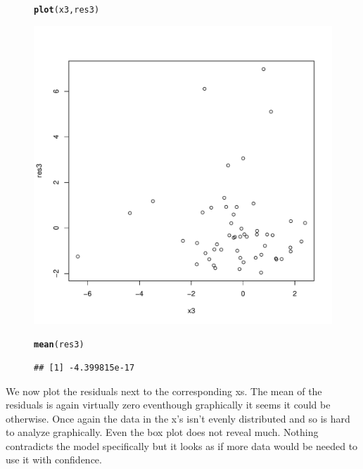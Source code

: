 \documentclass{article}\usepackage[]{graphicx}\usepackage[]{color}
\makeatletter
\def\maxwidth{ %
  \ifdim\Gin@nat@width>\linewidth
    \linewidth
  \else
    \Gin@nat@width
  \fi
}
\newcommand{\hlstd}[1]{\textcolor[rgb]{0.345,0.345,0.345}{#1}}%
\newcommand{\hlkwd}[1]{\textcolor[rgb]{0.737,0.353,0.396}{\textbf{#1}}}%
\newenvironment{kframe}{%
 \def\at@end@of@kframe{}%
 \ifinner\ifhmode%
  \def\at@end@of@kframe{\end{minipage}}%
  \begin{minipage}{\columnwidth}%
 \fi\fi%
 \def\FrameCommand##1{\hskip\@totalleftmargin \hskip-\fboxsep
 \colorbox{shadecolor}{##1}\hskip-\fboxsep
     \hskip-\linewidth \hskip-\@totalleftmargin \hskip\columnwidth}%
 \MakeFramed {\advance\hsize-\width
   \@totalleftmargin\z@ \linewidth\hsize
   \@setminipage}}%
 {\par\unskip\endMakeFramed%
 \at@end@of@kframe}
\newenvironment{knitrout}{}{} %
\makeatother
\begin{document}
\begin{figure}[htbp]
\begin{knitrout}
\color{fgcolor}\begin{kframe}
\begin{alltt}
\hlkwd{plot}\hlstd{(x3,res3)}
\end{alltt}
\end{kframe}
\includegraphics[width=\maxwidth]{figure/unnamed-chunk-8-1} 
\begin{kframe}\begin{alltt}
\hlkwd{mean}\hlstd{(res3)}
\end{alltt}
\begin{verbatim}
## [1] -4.399815e-17
\end{verbatim}
\end{kframe}
\end{knitrout}
\end{figure}
We now plot the residuals next to the corresponding xs. The mean of the residuals is again virtually zero eventhough graphically it seems it could be otherwise. Once again the data in the x's isn't evenly distributed and so is hard to analyze graphically. Even the box plot does not reveal much. Nothing contradicts the model specifically but it looks as if more data would be needed to use it with confidence. 
\end{document}
